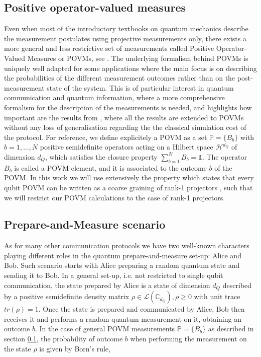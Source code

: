 \subsection{Positive operator-valued measures}\label{section:povms}
Even when most of the introductory textbooks on quantum mechanics describe the measurement postulates using projective measurements only, there exists a more general and less restrictive set of measurements called Positive Operator-Valued Measures or POVMs, see \cite{nielsen2000}\cite{peres1995}. The underlying formalism behind POVMs is uniquely well adapted for some applications where the main focus is on describing the probabilities of the different measurement outcomes rather than on the post-measurement state of the system. This is of particular interest in quantum communication and quantum information, where a more comprehensive formalism for the description of the measurements is needed, and highlights how important are the results from \cite{renner2022}, where all the results are extended to POVMs without any loss of generalisation regarding the the classical simulation cost of the protocol. For reference, we define explicitely a POVM as a set $\mathbb P=\{B_b\}$ with $b=1,...,N$ positive semidefinite operators acting on a Hilbert space $\mathcal{H}^{d_Q}$ of dimension $d_{Q}$, which satisfies the closure property $\sum_{b=1}^{N} B_{b} = \mathbb{1}$. The operator $B_{b}$ is called a POVM element, and it is associated to the outcome $b$ of the POVM. In this work we will use extensively the property which states that every qubit POVM can be written as a coarse graining of rank-1 projectors \cite{barrett2002}, such that we will restrict our POVM calculations to the case of rank-1 projectors.

\subsection{Prepare-and-Measure scenario}
As for many other communication protocols we have two well-known characters playing different roles in the quantum prepare-and-measure set-up: Alice and Bob. Such scenario starts with Alice preparing a random quantum state and sending it to Bob. In a general set-up, i.e. not restricted to single qubit communication, the state prepared by Alice is a state of dimension $d_Q$ described by a positive semidefinite density matrix $\rho \in \mathcal{L}( \mathbb{C}_{d_Q}), \rho \ge 0$ with unit trace $tr(\rho)=1$. Once the state is prepared and communicated by Alice, Bob then receives it and performs a random quantum measurement on it, obtaining an outcome $b$. In the case of general POVM measurements $\mathbb P=\{B_b\}$ as described in section \ref{section:povms}, the probability of outcome $b$ when performing the measurement on the state $\rho$ is given by Born's rule,

